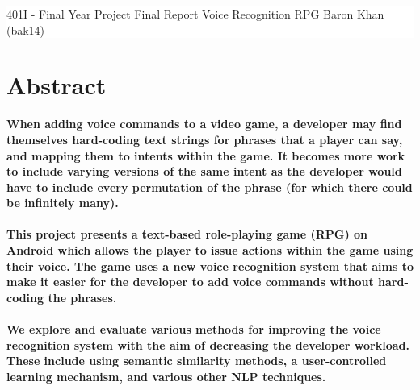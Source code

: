 \documentclass[12pt]{article}
\date{16 March 2017}
\begin{document}
\vspace*{6cm}
\colorbox{white}{
	\parbox[t]{1.0\linewidth}{
		\centering \fontsize{50pt}{80pt}\selectfont %
		\vspace*{0.7cm} %

		{401I - Final Year Project} \break
		\vspace*{0.7cm}
		Final Report
		\break
		Voice Recognition RPG
		\break
		Baron Khan (bak14)
		\vspace*{0.7cm} %
	}
}
\vfill %




\newpage
\thispagestyle{empty}
\tableofcontents
\newpage
\setcounter{page}{1}
\section{Abstract}

\textbf{When adding voice commands to a video game, a developer may find themselves hard-coding text strings for phrases that a player can say, and mapping them to intents within the game. It becomes more work to include varying versions of the same intent as the developer would have to include every permutation of the phrase (for which there could be infinitely many).
\\
\\
This project presents a text-based role-playing game (RPG) on Android which allows the player to issue actions within the game using their voice. The game uses a new voice recognition system that aims to make it easier for the developer to add voice commands without hard-coding the phrases.
\\
\\
We explore and evaluate various methods for improving the voice recognition system with the aim of decreasing the developer workload. These include using semantic similarity methods, a user-controlled learning mechanism, and various other NLP techniques.}

\newpage
\end{document}
